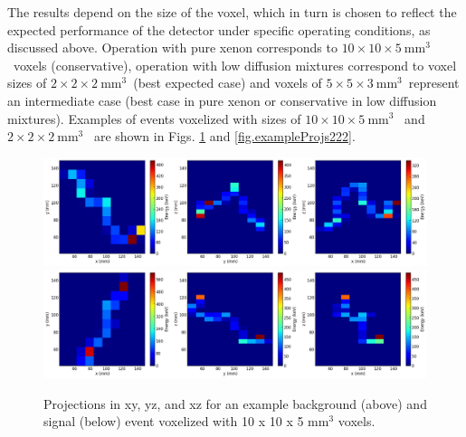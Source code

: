 \documentclass[a4paper,11pt]{article}
\begin{document}
The results depend on the size of the voxel, which in turn is chosen to reflect the expected performance of the detector under specific operating conditions, as discussed above. Operation with pure xenon corresponds to $10 \times 10 \times 5 \mathrm{~mm^3}$~voxels (conservative), operation with low diffusion mixtures correspond to voxel sizes of $2 \times 2 \times 2 \mathrm{~mm^3}$~(best expected case) and voxels of $5 \times 5 \times 3 \mathrm{~mm^3}$~represent an intermediate case (best case in pure xenon or conservative in low diffusion mixtures).  Examples of events voxelized with sizes of $10 \times 10 \times 5 \mathrm{~mm^3}$~ and
$2 \times 2 \times 2 \mathrm{~mm^3}$~ are shown in Figs. \ref{fig.exampleProjs10105} and \ref{fig.exampleProjs222}.

\begin{figure}[!htb]
	\centering
	\includegraphics[scale=0.36]{fig/plt_h2D_vox_dnn3d_NEXT100_Paolina10105_v10x10x5_r200x200x200_2_bg.png}
	\includegraphics[scale=0.36]{fig/plt_h2D_vox_dnn3d_NEXT100_Paolina10105_v10x10x5_r200x200x200_3_si.png}
	\caption{\label{fig.exampleProjs10105}Projections in xy, yz, and xz for an example background (above) and signal (below) event voxelized with 10 x 10 x 5 mm$^3$ voxels.}
\end{figure}
\end{document}
